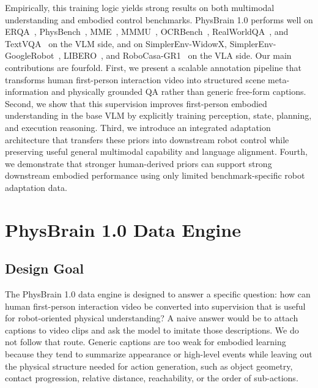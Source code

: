 \documentclass{llmxive}
\begin{document}
Empirically, this training logic yields strong results on both multimodal understanding and embodied control benchmarks. PhysBrain 1.0 performs well on ERQA~\cite{GoogleRobotics_2025_arxiv}, PhysBench~\cite{PhysBench_2025_arXiv}, MME~\cite{MME_2023_arXiv}, MMMU~\cite{MMMU_2024_CVPR}, OCRBench~\cite{OCRBenchV2_2025_arXiv}, RealWorldQA~\cite{realworldqa2024}, and TextVQA~\cite{TextVQA_2019_CVPR} on the VLM side, and on SimplerEnv-WidowX, SimplerEnv-GoogleRobot~\cite{SimplerEnv_2024_CoRL}, LIBERO~\cite{LIBERO_2023_NeurIPS}, and RoboCasa-GR1~\cite{RoboCasa_2024_RSS, GR00T_2025_arXiv} on the VLA side. Our main contributions are fourfold. First, we present a scalable annotation pipeline that transforms human first-person interaction video into structured scene meta-information and physically grounded QA rather than generic free-form captions. Second, we show that this supervision improves first-person embodied understanding in the base VLM by explicitly training perception, state, planning, and execution reasoning. Third, we introduce an integrated adaptation architecture that transfers these priors into downstream robot control while preserving useful general multimodal capability and language alignment. Fourth, we demonstrate that stronger human-derived priors can support strong downstream embodied performance using only limited benchmark-specific robot adaptation data.

\section{PhysBrain 1.0 Data Engine}
\label{sec:data_engine}

\subsection{Design Goal}

The PhysBrain 1.0 data engine is designed to answer a specific question: how can human first-person interaction video be converted into supervision that is useful for robot-oriented physical understanding? A naive answer would be to attach captions to video clips and ask the model to imitate those descriptions. We do not follow that route. Generic captions are too weak for embodied learning because they tend to summarize appearance or high-level events while leaving out the physical structure needed for action generation, such as object geometry, contact progression, relative distance, reachability, or the order of sub-actions.
\end{document}
